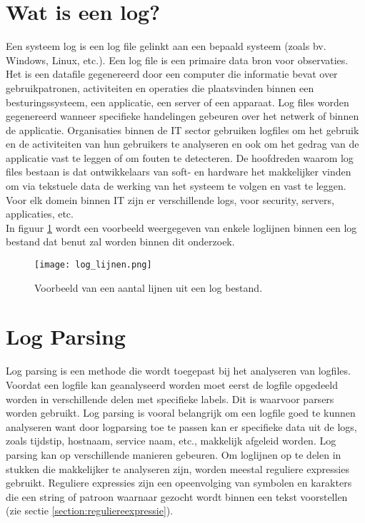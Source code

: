 \section{Wat is een log?}

Een systeem log is een log file gelinkt aan een bepaald systeem (zoals bv. Windows, Linux, etc.). Een log file is een primaire data bron voor observaties. Het is een datafile gegenereerd door een computer die informatie bevat over gebruikpatronen, activiteiten en operaties die plaatsvinden binnen een besturingssysteem, een applicatie, een server of een apparaat. Log files worden gegenereerd wanneer specifieke handelingen gebeuren over het netwerk of binnen de applicatie. Organisaties binnen de IT sector gebruiken logfiles om het gebruik en de activiteiten van hun gebruikers te analyseren en ook om het gedrag van de applicatie vast te leggen of om fouten te detecteren. De hoofdreden waarom log files bestaan is dat ontwikkelaars van soft- en hardware het makkelijker vinden om via tekstuele data de werking van het systeem te volgen en vast te leggen. Voor elk domein binnen IT zijn er verschillende logs, voor security, servers, applicaties, etc.\\

In figuur \ref{pic:loglijnen} wordt een voorbeeld weergegeven van enkele loglijnen binnen een log bestand dat benut zal worden binnen dit onderzoek.

\begin{figure}[!htp]
    \texttt{[image: log\_lijnen.png]}
    \caption{Voorbeeld van een aantal lijnen uit een log bestand.}
    \label{pic:loglijnen}
\end{figure}

\section{Log Parsing}

Log parsing is een methode die wordt toegepast bij het analyseren van logfiles. Voordat een logfile kan geanalyseerd worden moet eerst de logfile opgedeeld worden in verschillende delen met specifieke labels. Dit is waarvoor parsers worden gebruikt. Log parsing is vooral belangrijk om een logfile goed te kunnen analyseren want door logparsing toe te passen kan er specifieke data uit de logs, zoals tijdstip, hostnaam, service naam, etc., makkelijk afgeleid worden. Log parsing kan op verschillende manieren gebeuren. Om loglijnen op te delen in stukken die makkelijker te analyseren zijn, worden meestal reguliere expressies gebruikt. Reguliere expressies zijn een opeenvolging van symbolen en karakters die een string of patroon waarnaar gezocht wordt binnen een tekst voorstellen (zie sectie \ref{section:reguliereexpressie}).

